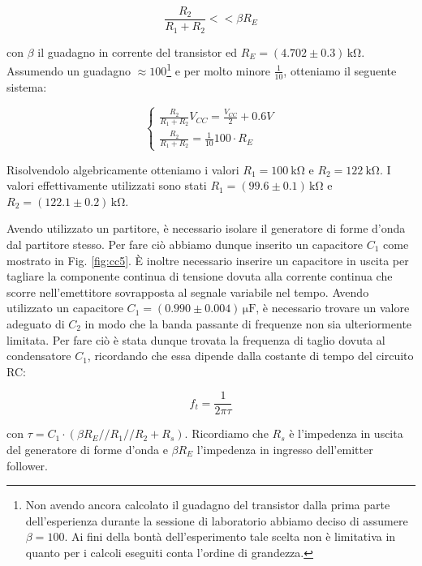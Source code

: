 \begin{equation}
\frac{R_2}{R_1+R_2} <<\beta R_E
\label{partitore2}
\end{equation}

con $\beta$ il guadagno in corrente del transistor ed $R_E=(4.702\pm0.3)\,\si{\kilo\ohm}$. Assumendo un guadagno $\approx 100$\footnote{Non avendo ancora calcolato il guadagno del transistor dalla prima parte dell'esperienza durante la sessione di laboratorio abbiamo deciso di assumere $\beta=100$. Ai fini della bontà dell'esperimento tale scelta non è limitativa in quanto per i calcoli eseguiti conta l'ordine di grandezza.} e per molto minore $\frac{1}{10}$, otteniamo il seguente sistema:

\begin{equation}
\begin{cases}
\frac{R_2}{R_1+R_2} V_{CC}=\frac{V_{CC}}{2} + 0.6V\\
\frac{R_2}{R_1+R_2} =\frac{1}{10} 100 \cdot R_E
\end{cases}
\end{equation}

Risolvendolo algebricamente otteniamo i valori $R_1=\SI{100}{\kilo\ohm}$ e $R_2=\SI{122}{\kilo\ohm}$. I valori effettivamente utilizzati sono stati $R_1=(99.6\pm0.1)\,\si{\kilo\ohm}$ e $R_2=(122.1\pm0.2)\,\si{\kilo\ohm}$.

Avendo utilizzato un partitore, è necessario isolare il generatore di forme d'onda dal partitore stesso. Per fare ciò abbiamo dunque inserito un capacitore $C_1$ come mostrato in Fig. \ref{fig:cc5}.
\`E inoltre necessario inserire un capacitore in uscita per tagliare la componente continua di tensione dovuta alla corrente continua che scorre nell'emettitore sovrapposta al segnale variabile nel tempo. 
Avendo utilizzato un capacitore $C_1=(0.990\pm0.004)\,\si{\micro\farad}$, è necessario trovare un valore adeguato di $C_2$ in modo che la banda passante di frequenze non sia ulteriormente limitata. Per fare ciò è stata dunque trovata la frequenza di taglio dovuta al condensatore $C_1$, ricordando che essa dipende dalla costante di tempo del circuito RC:

\begin{equation}
f_t=\frac{1}{2\pi \tau} 
\label{taglio}
\end{equation}

con $\tau=C_1 \cdot (\beta R_E//R_1//R_2+R_s)$. Ricordiamo che $R_s$ è l'impedenza in uscita del generatore di forme d'onda e $\beta R_E$ l'impedenza in ingresso dell'emitter follower.

